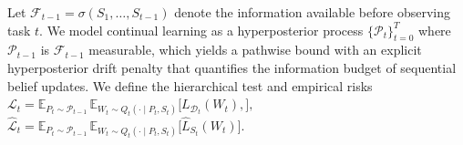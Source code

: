 \documentclass{article}
\theoremstyle{plain}
\theoremstyle{definition}
\theoremstyle{remark}
\begin{document}

Let $\mathcal F_{t-1}=\sigma(S_1,\dots,S_{t-1})$ denote the information available before observing task $t$. We model continual learning as a hyperposterior process $\{\mathcal P_t\}_{t=0}^T$ where $\mathcal P_{t-1}$ is $\mathcal F_{t-1}$ measurable, which yields a pathwise bound with an explicit hyperposterior drift penalty that quantifies the information budget of sequential belief updates. We define the hierarchical test and empirical risks
$
\mathcal L_t
=
\mathbb E_{P_t \sim \mathcal{P}_{t-1}}
\,
\mathbb E_{W_t \sim Q_t(\cdot \mid P_t,S_t)}
\big[
L_{\mathcal D_t}(W_t),
\big],
$
$
\hat{\mathcal L}_t
=
\mathbb E_{P_t \sim \mathcal{P}_{t-1}}
\,
\mathbb E_{W_t \sim Q_t(\cdot \mid P_t,S_t)}
\big[
\hat L_{S_t}(W_t)
\big].
$
\end{document}
